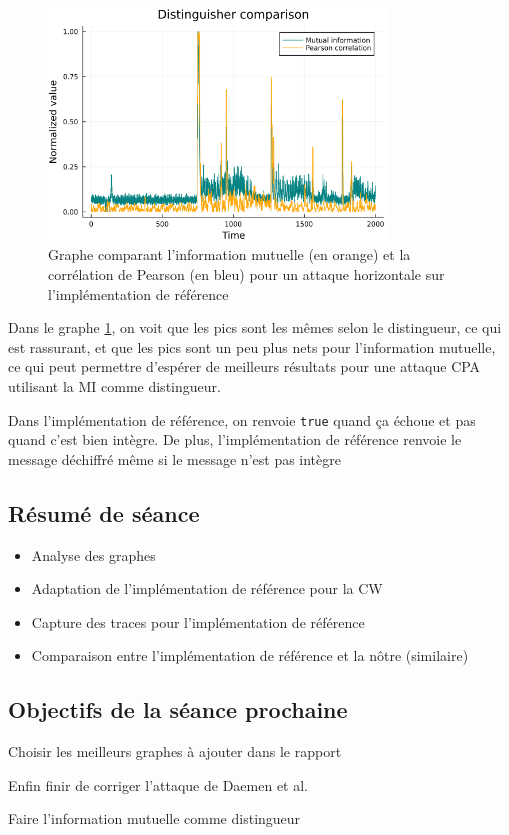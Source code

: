 \documentclass[12pt]{article}
\newcommand{\cmark}{\ding{51}}%
\newcommand{\done}{\rlap{$\square$}{\raisebox{2pt}{\large\hspace{1pt}\cmark}}%
	\hspace{-2.5pt}}
\begin{document}
	\begin{figure}[H]
		\centering
		\includegraphics[width=0.8\textwidth]{img_files/corr_vs_MI_hHW}
		\caption{Graphe comparant l'information mutuelle (en orange) et la corrélation de Pearson (en bleu) pour un attaque horizontale sur l'implémentation de référence}
		\label{corvsMI}
	\end{figure}
	
	Dans le graphe \ref{corvsMI}, on voit que les pics sont les mêmes selon le distingueur, ce qui est rassurant, et que les pics sont un peu plus nets pour l'information mutuelle, ce qui peut permettre d'espérer de meilleurs résultats pour une attaque CPA utilisant la MI comme distingueur.
	
	\warning Dans l'implémentation de référence, on renvoie \verb|true| quand ça échoue et pas quand c'est bien intègre. De plus, l'implémentation de référence renvoie le message déchiffré même si le message n'est pas intègre
	
	\subsection{Résumé de séance}
	\begin{itemize}
		\item Analyse des graphes
		\item Adaptation de l'implémentation de référence pour la CW
		\item Capture des traces pour l'implémentation de référence
		\item Comparaison entre l'implémentation de référence et la nôtre (similaire)
	\end{itemize}
	
	\subsection{Objectifs de la séance prochaine}
	\begin{todolist}
		\item[\done] Choisir les meilleurs graphes à ajouter dans le rapport
		\item Enfin finir de corriger l'attaque de Daemen et al.
		\item[\done] Faire l'information mutuelle comme distingueur
	\end{todolist}
	
\end{document}
